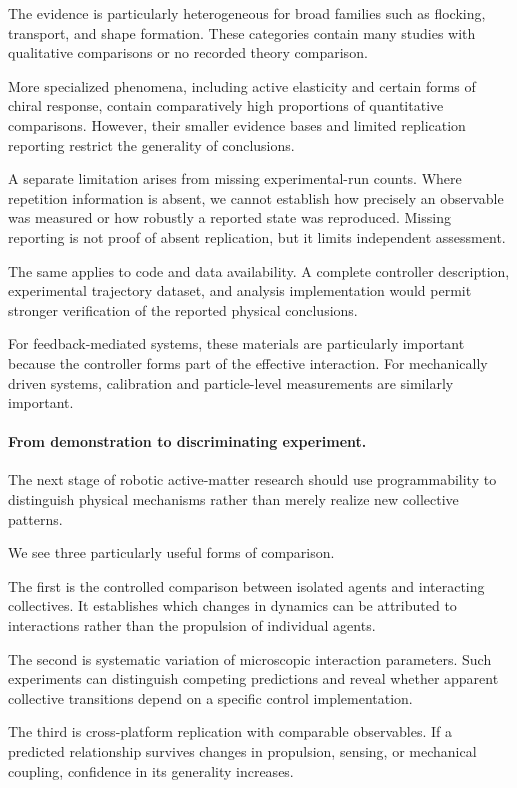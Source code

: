 The evidence is
particularly heterogeneous
for broad families
such as flocking,
transport, and
shape formation.
These categories
contain many studies
with qualitative
comparisons or
no recorded
theory comparison.

More specialized
phenomena, including
active elasticity
and certain forms
of chiral response,
contain comparatively
high proportions
of quantitative
comparisons.
However, their
smaller evidence
bases and limited
replication reporting
restrict the generality
of conclusions.

A separate limitation
arises from missing
experimental-run counts.
Where repetition
information is absent,
we cannot establish
how precisely an
observable was measured
or how robustly
a reported state
was reproduced.
Missing reporting
is not proof
of absent replication,
but it limits
independent assessment.

The same applies
to code and data
availability.
A complete controller
description,
experimental trajectory
dataset, and
analysis implementation
would permit stronger
verification of
the reported physical
conclusions.

For feedback-mediated
systems, these materials
are particularly important
because the controller
forms part of the
effective interaction.
For mechanically driven
systems, calibration
and particle-level
measurements are
similarly important.

\paragraph*{From demonstration to discriminating experiment.}

The next stage of robotic active-matter
research should use programmability
to distinguish physical mechanisms
rather than merely realize
new collective patterns.

We see three particularly useful
forms of comparison.

The first is the controlled
comparison between isolated
agents and interacting
collectives. It establishes
which changes in dynamics
can be attributed to
interactions rather
than the propulsion
of individual agents.

The second is systematic
variation of microscopic
interaction parameters.
Such experiments can
distinguish competing
predictions and reveal
whether apparent
collective transitions
depend on a specific
control implementation.

The third is cross-platform
replication with comparable
observables. If a predicted
relationship survives
changes in propulsion,
sensing, or mechanical
coupling, confidence
in its generality
increases.

